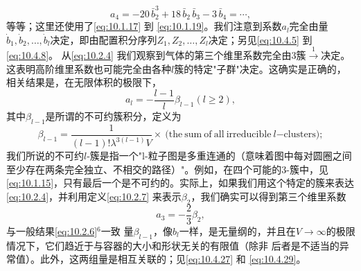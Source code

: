 \begin{equation}\tag{10.2.5}\label{eq:10.2.5}
a _ { 4 } = - 20 \, \bar { b } _ { 2 } ^{3} + 18 \, \bar { b } _ { 2 } \, \bar { b } _ { 3 } - 3 \, \bar { b } _ { 4 } = \cdots ,
\end{equation}
等等；这里还使用了\autoref{eq:10.1.17} 到 \autoref{eq:10.1.19}。我们注意到系数\(a_{l}\)完全由量\(\dot{b}_{1}, \dot{b}_{2}, \ldots, \dot{b}_{l}\)决定，即由配置积分序列\(Z_{1}, Z_{2}, \ldots, Z_{l}\)决定；另见\autoref{eq:10.4.5} 到 \autoref{eq:10.4.8}。
从\autoref{eq:10.2.4} 我们观察到气体的第三个维里系数完全由3簇\(\stackrel{1}{\rightarrow}\)决定。这表明高阶维里系数也可能完全由各种\(l\)簇的特定"子群"决定。这确实是正确的，相关结果是，在无限体积的极限下，
\begin{equation}\tag{10.2.6}\label{eq:10.2.6}
a _ { l } = - \frac { l - 1 } { l } \beta _ { l - 1 }  ( l \geq 2 ) ,
\end{equation}
其中\(\beta_{l-1}\)是所谓的不可约簇积分，定义为
\begin{equation}\tag{10.2.7}\label{eq:10.2.7}
\beta _ { l - 1 } = \frac { 1 } { ( l - 1 ) ! \lambda ^{3 ( l - 1 )} V } \times \mathrm { ~ ( t h e ~ s u m ~ o f ~ a l l ~ i r r e d u c i b l e ~ } l \mathrm { - c l u s t e r s ) ; }
\end{equation}
我们所说的不可约\(l\)-簇是指一个"l-粒子图是多重连通的（意味着图中每对圆圈之间至少存在两条完全独立、不相交的路径）"。例如，在四个可能的3-簇中，见\autoref{eq:10.1.15}，只有最后一个是不可约的。实际上，如果我们用这个特定的簇来表达\autoref{eq:10.2.4}，并利用定义\autoref{eq:10.2.7} 来表示\(\beta_2\)，我们确实可以得到第三个维里系数
\begin{equation}\tag{10.2.8}\label{eq:10.2.8}
a _ { 3 } = - \frac { 2 } { 3 } \beta _ { 2 } ,
\end{equation}
与一般结果\autoref{eq:10.2.6}\(^{6}\)一致
量\(\beta_{l-1}\)，像\(b_{l}\)一样，是无量纲的，并且在\(V \rightarrow \infty\)的极限情况下，它们趋近于与容器的大小和形状无关的有限值（除非
后者是不适当的异常值）。此外，这两组量是相互关联的；见\autoref{eq:10.4.27} 和 \autoref{eq:10.4.29}。
